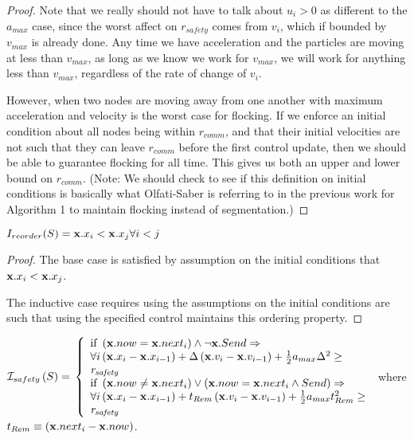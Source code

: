 \documentclass[10pt, conference, compsocconf]{IEEEtran}
\begin{document}
\begin{proof}
Note that we really should not have to talk about $u_i > 0$ as different to the $a_{max}$ case, since the worst affect on $\mathit{r_{safety}}$ comes from $v_i$, which if bounded by $v_{max}$ is already done.  Any time we have acceleration and the particles are moving at less than $v_{max}$, as long as we know we work for $v_{max}$, we will work for anything less than $v_{max}$, regardless of the rate of change of $v_i$.

However, when two nodes are moving away from one another with maximum acceleration and velocity is the worst case for flocking.  If we enforce an initial condition about all nodes being within $r_{comm}$, and that their initial velocities are not such that they can leave $r_{comm}$ before the first control update, then we should be able to guarantee flocking for all time.  This gives us both an upper and lower bound on $r_{comm}$.  (Note: We should check to see if this definition on initial conditions is basically what Olfati-Saber is referring to in the previous work for Algorithm 1 to maintain flocking instead of segmentation.)

\end{proof}

\begin{inv}
$I_{reorder}(S) = {\bf x}.x_i < {\bf x}.x_j \forall i < j$
\end{inv}

\begin{proof}
The base case is satisfied by assumption on the initial conditions that ${\bf x}.x_i < {\bf x}.x_j$.

The inductive case requires using the assumptions on the initial conditions are such that using the specified control maintains this ordering property.
\end{proof}

\begin{inv}

${\cal I}_{safety}\left(S\right) = \\
	\left\{ \begin{array}{l}
		\textrm{if } \left( {\bf x}.now = {\bf x}.next_i \right) \wedge \neg {\bf x}.Send \Rightarrow \\
		\forall i \left({\bf x}.x_{i} - {\bf x}.x_{i-1}\right) + \Delta\left({\bf x}.v_{i} - {\bf x}.v_{i-1}\right) + \frac{1}{2}a_{max}\Delta^2 \geq \\ \mathit{r_{safety}} \\
		\textrm{if } \left( {\bf x}.now \neq {\bf x}.next_i \right) \vee \left( {\bf x}.now = {\bf x}.next_i \wedge Send \right) \Rightarrow \\
		\forall i \left({\bf x}.x_{i} - {\bf x}.x_{i-1}\right) + t_{Rem}\left({\bf x}.v_{i} - {\bf x}.v_{i-1}\right) + \frac{1}{2}a_{max}t_{Rem}^2 \geq \\  \mathit{r_{safety}} \\
	\end{array}
\right.$ where $t_{Rem} \equiv \left({\bf x}.next_i - {\bf x}.now\right)$.
\end{inv}
\end{document}
